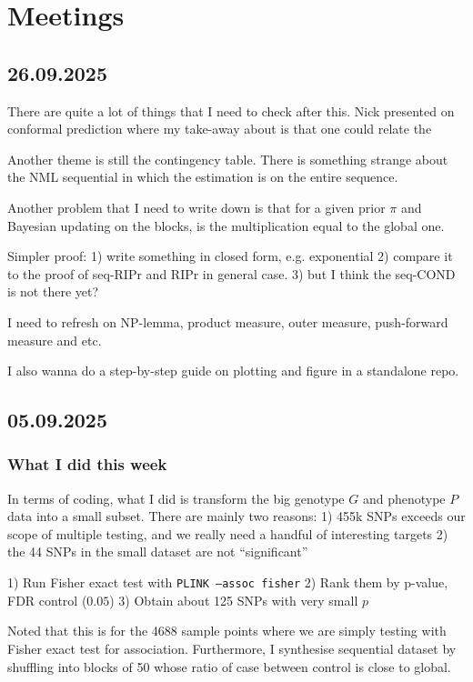 \newpage

\section{Meetings}

\subsection*{26.09.2025}

There are quite a lot of things that I need to check after this. 
Nick presented on conformal prediction where my take-away about is that 
one could relate the

Another theme is still the contingency table. 
There is something strange about the NML sequential 
in which the estimation is on the entire sequence.

Another problem that I need to write down is that for a given prior $\pi$
and Bayesian updating on the blocks, is the multiplication equal to the 
global one.

Simpler proof: 
1) write something in closed form, e.g. exponential
2) compare it to the proof of seq-RIPr and RIPr in general case.
3) but I think the seq-COND is not there yet?

I need to refresh on NP-lemma, product measure, outer measure, push-forward measure
and etc.

I also wanna do a step-by-step guide on plotting and figure in a standalone repo.

\subsection*{05.09.2025}

\subsubsection*{What I did this week}

In terms of coding, what I did is transform the big genotype $G$ and phenotype $P$ data
into a small subset. There are mainly two reasons:
1) 455k SNPs exceeds our scope of multiple testing, and we really need a handful
of interesting targets
2) the 44 SNPs in the small dataset are not ``significant''

1) Run Fisher exact test with \texttt{PLINK --assoc fisher}
2) Rank them by p-value, FDR control ($0.05$) 
3) Obtain about 125 SNPs with very small $p$

Noted that this is for the 4688 sample points where we are simply testing 
with Fisher exact test for association. 
Furthermore, I synthesise sequential dataset by shuffling into blocks 
of 50 whose ratio of case between control is close to global.


